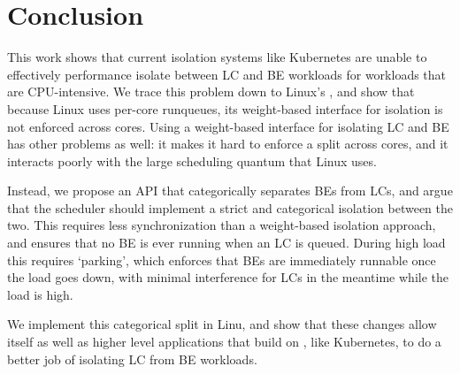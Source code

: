\section{Conclusion}

This work shows that current isolation systems like Kubernetes are unable to
effectively performance isolate between LC and BE workloads for workloads that
are CPU-intensive. We trace this problem down to Linux's \cgroups{}, and show
that because Linux uses per-core runqueues, its weight-based interface for
isolation is not enforced across cores. Using a weight-based interface for
isolating LC and BE has other problems as well: it makes it hard to enforce a
split across cores, and it interacts poorly with the large scheduling quantum
that Linux uses.

Instead, we propose an API that categorically separates BEs from LCs, and argue
that the scheduler should implement a strict and categorical isolation between
the two. This requires less synchronization than a weight-based isolation
approach, and ensures that no BE is ever running when an LC is queued. During
high load this requires `parking', which enforces that BEs are immediately
runnable once the load goes down, with minimal interference for LCs in the
meantime while the load is high.

We implement this categorical split in Linu, and show that these changes allow
\cgroups{} itself as well as higher level applications that build on \cgroups{},
like Kubernetes, to do a better job of isolating LC from BE workloads.

